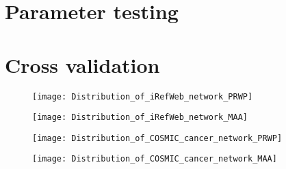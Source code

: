 \section{Parameter testing}
\section{Cross validation}
\begin{figure}
    \label{fig:irefweb-prwp}
    \texttt{[image: Distribution\_of\_iRefWeb\_network\_PRWP]}
\end{figure}
\begin{figure}
    \label{fig:irefweb-maa}
    \texttt{[image: Distribution\_of\_iRefWeb\_network\_MAA]}
\end{figure}
\begin{figure}
    \label{fig:cosmic-prwp}
    \texttt{[image: Distribution\_of\_COSMIC\_cancer\_network\_PRWP]}
\end{figure}
\begin{figure}
    \label{fig:cosmic-maa}
    \texttt{[image: Distribution\_of\_COSMIC\_cancer\_network\_MAA]}
\end{figure}

